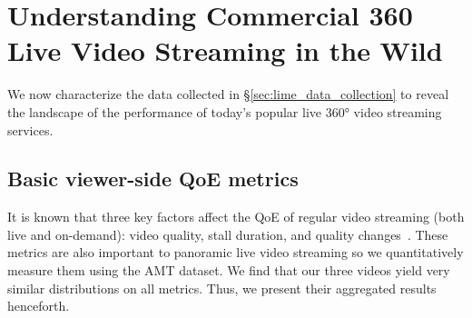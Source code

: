 \section{Understanding Commercial 360\degree{} Live Video Streaming in the Wild}
We now characterize the data collected in \S\ref{sec:lime_data_collection} to reveal the landscape of the performance of today’s popular live 360° video
streaming services.

\subsection{Basic viewer-side QoE metrics}
It is known that three key factors affect the QoE of regular video streaming (both live and on-demand): video quality, stall duration, and quality changes~\cite{yin2015control,huang2015buffer,mao2017neural,dimopoulos2015identifying}. These metrics are also important to panoramic live video streaming so we quantitatively measure them using the AMT dataset. We find that our three videos yield very similar distributions on all metrics. Thus, we present their aggregated results henceforth.

